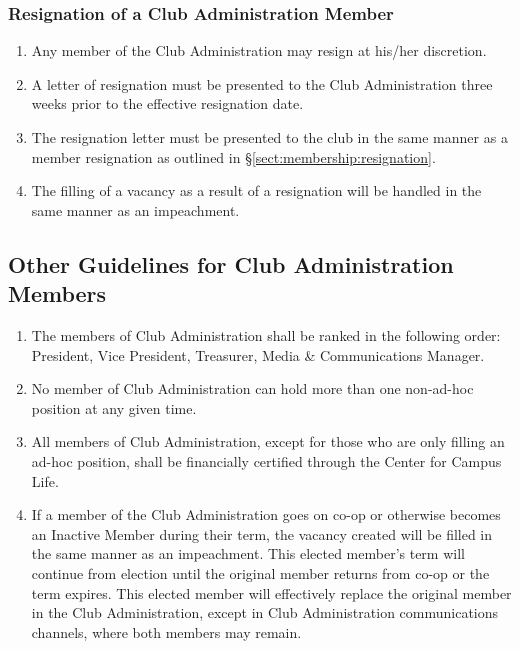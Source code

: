 \documentclass[english,11pt]{article}
\begin{document}
\subsubsection{Resignation of a Club Administration Member} \label{subsect:cadmin:removal:resignation}

\begin{enumerate}[label=\alph*.]
    \item Any member of the Club Administration may resign at his/her discretion.
    \item A letter of resignation must be presented to the Club Administration three weeks prior to the effective resignation date.
    \item The resignation letter must be presented to the club in the same manner as a member resignation as outlined in §\ref{sect:membership:resignation}.
    \item The filling of a vacancy as a result of a resignation will be handled in the same manner as an impeachment.
\end{enumerate}

\subsection{Other Guidelines for Club Administration Members} \label{subsect:cadmin:other}

\begin{enumerate}[label=\Alph*.]
    \item The members of Club Administration shall be ranked in the following order: President, Vice President, Treasurer, Media \& Communications Manager.
    \item No member of Club Administration can hold more than one non-ad-hoc position at any given time.
    \item All members of Club Administration, except for those who are only filling an ad-hoc position, shall be financially certified through the Center for Campus Life.
    \item If a member of the Club Administration goes on co-op or otherwise becomes an Inactive Member during their term, the vacancy created will be filled in the same manner as an impeachment.
          This elected member's term will continue from election until the original member returns from co-op or the term expires.
          This elected member will effectively replace the original member in the Club Administration, except in Club Administration communications channels, where both members may remain.
\end{enumerate}
\end{document}
